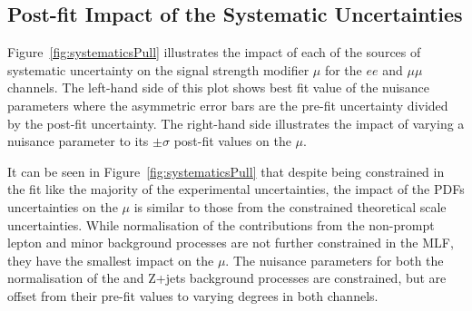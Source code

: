 \subsection{Post-fit Impact of the Systematic Uncertainties}\label{sec:uncertainitiesImpact}
Figure~\ref{fig:systematicsPull} illustrates the impact of each of the sources of systematic uncertainty on the signal strength modifier $\mu$ for the $ee$ and $\mu\mu$ channels.
The left-hand side of this plot shows best fit value of the nuisance parameters where the asymmetric error bars are the pre-fit uncertainty divided by the post-fit uncertainty.
The right-hand side illustrates the impact of varying a nuisance parameter to its $\pm \sigma$ post-fit values on the $\mu$.

It can be seen in Figure~\ref{fig:systematicsPull} that despite being constrained in the fit like the majority of the experimental uncertainties, the impact of the PDFs uncertainties on the $\mu$ is similar to those from the constrained theoretical scale uncertainties.
While normalisation of the contributions from the non-prompt lepton and minor background processes are not further constrained in the MLF, they have the smallest impact on the $\mu$.
The nuisance parameters for both the normalisation of the \ttbar and Z+jets background processes are constrained, but are offset from their pre-fit values to varying degrees in both channels.

